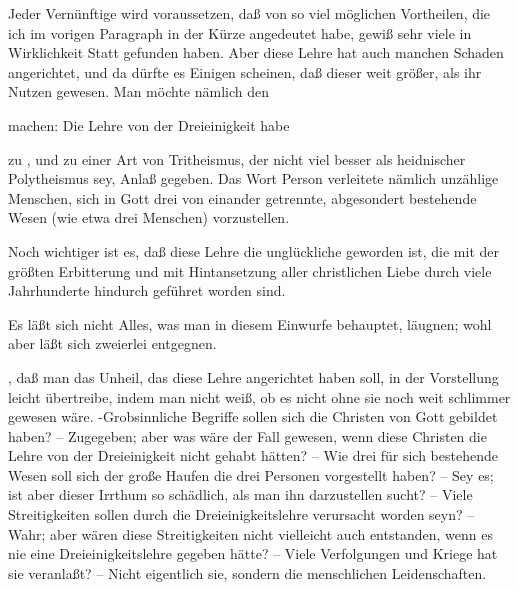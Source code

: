 Jeder Vernünftige wird voraussetzen, daß von so viel möglichen Vortheilen, die ich im vorigen Paragraph in der Kürze angedeutet habe, gewiß sehr viele in Wirklichkeit Statt gefunden haben. Aber diese Lehre hat auch manchen Schaden angerichtet, und da dürfte es Einigen scheinen, daß dieser weit größer, als ihr Nutzen gewesen. Man möchte nämlich den \par
{} machen: Die Lehre von der Dreieinigkeit habe 
\begin{aufzb}
\item zu , und zu einer Art von Tritheismus, der nicht viel besser als heidnischer Polytheismus sey, Anlaß gegeben. Das Wort Person verleitete nämlich unzählige Menschen, sich in Gott drei von einander getrennte, abgesondert bestehende Wesen (wie etwa drei Menschen) vorzustellen.
\item Noch wichtiger ist es, daß diese Lehre die unglückliche  geworden ist, die mit der größten Erbitterung und mit Hintansetzung aller christlichen Liebe durch viele Jahrhunderte hindurch geführet worden sind.
\end{aufzb}\par
{} Es läßt sich nicht Alles, was man in diesem Einwurfe behauptet, läugnen; wohl aber läßt sich zweierlei entgegnen.\par
{}, daß man das Unheil, das diese Lehre angerichtet haben soll, in der Vorstellung leicht übertreibe, indem man nicht weiß, ob es nicht ohne sie noch weit schlimmer gewesen wäre. -Grobsinnliche Begriffe sollen sich die Christen von Gott gebildet haben? -- Zugegeben; aber was wäre der Fall gewesen, wenn diese Christen die Lehre von der Dreieinigkeit nicht gehabt hätten? -- Wie drei für sich bestehende Wesen soll sich der große Haufen die drei Personen vorgestellt haben? -- Sey es; ist aber dieser Irrthum so schädlich, als man ihn darzustellen sucht? -- Viele Streitigkeiten sollen durch die Dreieinigkeitslehre verursacht worden seyn? -- Wahr; aber wären diese Streitigkeiten nicht vielleicht auch entstanden, wenn es nie eine Dreieinigkeitslehre gegeben hätte? -- Viele Verfolgungen und Kriege hat sie veranlaßt? -- Nicht eigentlich sie, sondern die menschlichen Leidenschaften.\par
